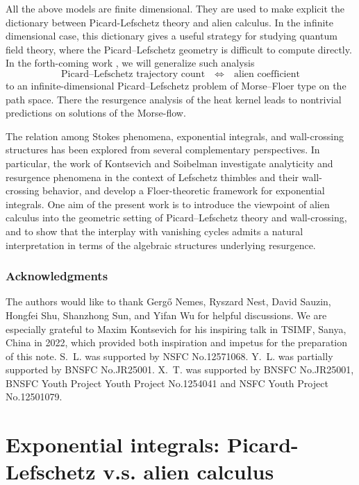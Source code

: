 \documentclass[11pt]{amsart}
\theoremstyle{plain}
\begin{document}
All the above models are finite dimensional. They are used to make explicit
the dictionary between Picard-Lefschetz theory and alien calculus. In the infinite dimensional case, this dictionary gives a useful strategy for studying quantum field theory, where the Picard--Lefschetz geometry is difficult to compute directly. In the forth-coming work \cite{LLT2026-2}, we will generalize such analysis 
\[
\text{Picard--Lefschetz trajectory count} 
\quad \Longleftrightarrow \quad
\text{alien coefficient}
\]
to an infinite-dimensional Picard–Lefschetz problem of Morse–Floer type on the path space. There the resurgence analysis of the heat kernel leads to nontrivial predictions on solutions of the Morse-flow. 

The relation among Stokes phenomena, exponential integrals, and wall-crossing structures has been explored from several complementary perspectives. In particular, the work of Kontsevich and Soibelman \cite{KS-2022,KS-2024} investigate analyticity and resurgence phenomena in the context of Lefschetz thimbles and their wall-crossing behavior, and develop a Floer-theoretic framework for exponential integrals. One aim of the present work is to introduce the viewpoint of alien calculus into the geometric setting of Picard–Lefschetz theory and wall-crossing, and to show that the interplay with vanishing cycles admits a natural interpretation in terms of the algebraic structures underlying resurgence.


\smallskip
\subsubsection*{Acknowledgments}

The authors would like to thank Gerg\H{o} Nemes, Ryszard Nest, David Sauzin, Hongfei Shu, Shanzhong Sun,
and Yifan Wu for helpful discussions.  We are especially grateful to
Maxim Kontsevich for his inspiring talk in TSIMF, Sanya, China in 2022, which provided
both inspiration and impetus for the preparation of this note. {S.~L. was supported by NSFC No.12571068.  Y.~L. was partially supported by BNSFC No.JR25001.  X.~T. was supported by BNSFC No.JR25001, BNSFC Youth Project Youth Project No.1254041 and NSFC Youth Project No.12501079.}

\medskip
\section{Exponential integrals: Picard-Lefschetz v.s. alien calculus}\label{sec:general}
\end{document}
